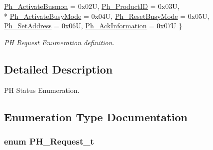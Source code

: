 \begin{DoxyCompactItemize}
\hyperlink{group___k_n_x___p_h___sup___exported___types_gga78f5bed722457f025cbc6786d5730d3eaaab6813d086f4fee2279e47bd9f474f1}{Ph\+\_\+\+Activate\+Busmon} = 0x02U, 
\hyperlink{group___k_n_x___p_h___sup___exported___types_gga78f5bed722457f025cbc6786d5730d3eab570f51bc280e629f45421a3d1f8240f}{Ph\+\_\+\+Product\+ID} = 0x03U, 
\\*
\hyperlink{group___k_n_x___p_h___sup___exported___types_gga78f5bed722457f025cbc6786d5730d3eabeba2b32d6d52cd78e0fcc0a2893fe55}{Ph\+\_\+\+Activate\+Busy\+Mode} = 0x04U, 
\hyperlink{group___k_n_x___p_h___sup___exported___types_gga78f5bed722457f025cbc6786d5730d3ea1d8679556ec07170396cbe6b50b2b1d3}{Ph\+\_\+\+Reset\+Busy\+Mode} = 0x05U, 
\hyperlink{group___k_n_x___p_h___sup___exported___types_gga78f5bed722457f025cbc6786d5730d3eab5991f81f2614188770e51ca5623de44}{Ph\+\_\+\+Set\+Address} = 0x06U, 
\hyperlink{group___k_n_x___p_h___sup___exported___types_gga78f5bed722457f025cbc6786d5730d3ea1e5d3927d90dd27ee5bfa4c20e6a3e46}{Ph\+\_\+\+Ack\+Information} = 0x07U
 \}\begin{DoxyCompactList}\small\item\em PH Request Enumeration definition. \end{DoxyCompactList}
\end{DoxyCompactItemize}


\subsection{Detailed Description}
PH Status Enumeration. 



\subsection{Enumeration Type Documentation}
\subsubsection[{\texorpdfstring{P\+H\+\_\+\+Request\+\_\+t}{PH_Request_t}}]{\setlength{\rightskip}{0pt plus 5cm}enum {\bf P\+H\+\_\+\+Request\+\_\+t}}\hypertarget{group___k_n_x___p_h___sup___exported___types_ga78f5bed722457f025cbc6786d5730d3e}{}\label{group___k_n_x___p_h___sup___exported___types_ga78f5bed722457f025cbc6786d5730d3e}


